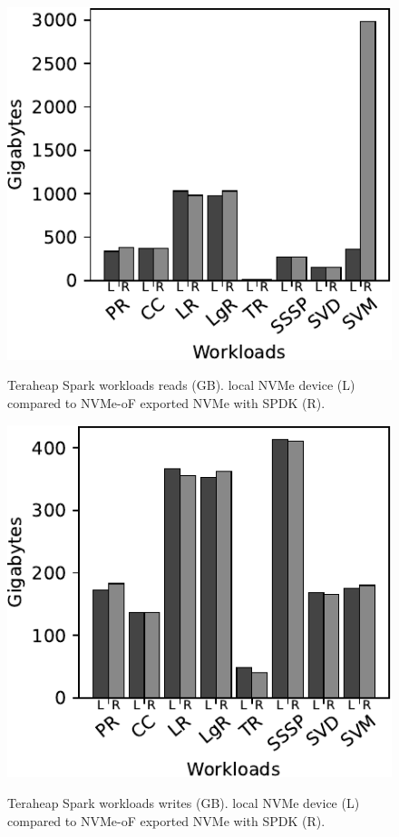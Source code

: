 \begin{figure}[H]
  \includegraphics[width=\linewidth]{figures/spark_r.pdf}\\
\caption{Teraheap Spark workloads reads (GB). local NVMe device (L) compared to NVMe-oF exported NVMe with SPDK (R).}
\label{fig:spark_r}
\end{figure}
\begin{figure}[H]
  \includegraphics[width=\linewidth]{figures/spark_w.pdf}\\
\caption{Teraheap Spark workloads writes (GB). local NVMe device (L) compared to NVMe-oF exported NVMe with SPDK (R).}
\label{fig:spark_w}
\end{figure}
